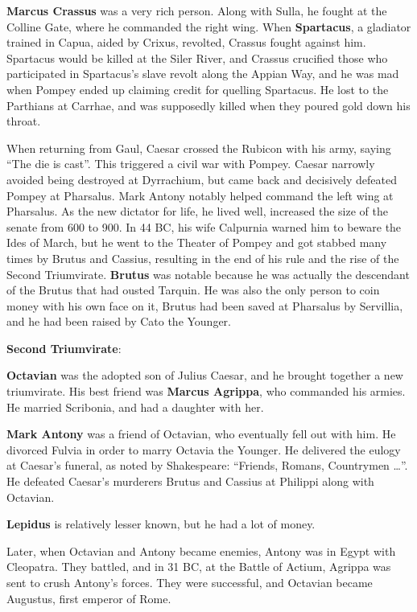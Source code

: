 \textbf{Marcus Crassus} was a very rich person.
Along with Sulla, he fought at the Colline Gate, where he commanded the right wing.
When \textbf{Spartacus}, a gladiator trained in Capua, aided by Crixus, revolted, Crassus fought against him.
Spartacus would be killed at the Siler River, and
Crassus crucified those who participated in Spartacus's slave revolt along the Appian Way,
and he was mad when Pompey ended up claiming credit for quelling Spartacus.
He lost to the Parthians at Carrhae, and was supposedly killed when they poured gold down his throat.

When returning from Gaul, Caesar crossed the Rubicon with his army, saying ``The die is cast''.
This triggered a civil war with Pompey.
Caesar narrowly avoided being destroyed at Dyrrachium, but came back and decisively defeated Pompey at Pharsalus.
Mark Antony notably helped command the left wing at Pharsalus.
As the new dictator for life, he lived well, increased the size of the senate from 600 to 900.
In 44 BC, his wife Calpurnia warned him to beware the Ides of March,
but he went to the Theater of Pompey and got stabbed many times by Brutus and Cassius,
resulting in the end of his rule and the rise of the Second Triumvirate.
\textbf{Brutus} was notable because he was actually the descendant of the Brutus that had ousted Tarquin.
He was also the only person to coin money with his own face on it,
Brutus had been saved at Pharsalus by Servillia, and he had been raised by Cato the Younger.

\textbf{Second Triumvirate}:

\textbf{Octavian} was the adopted son of Julius Caesar, and he brought together a new triumvirate.
His best friend was \textbf{Marcus Agrippa}, who commanded his armies.
He married Scribonia, and had a daughter with her.

\textbf{Mark Antony} was a friend of Octavian, who eventually fell out with him.
He divorced Fulvia in order to marry Octavia the Younger.
He delivered the eulogy at Caesar's funeral, as noted by Shakespeare:
``Friends, Romans, Countrymen \ldots''.
He defeated Caesar's murderers Brutus and Cassius at Philippi along with Octavian.

\textbf{Lepidus} is relatively lesser known, but he had a lot of money.

Later, when Octavian and Antony became enemies, Antony was in Egypt with Cleopatra.
They battled, and in 31 BC, at the Battle of Actium, Agrippa was sent to crush Antony's forces.
They were successful, and Octavian became Augustus, first emperor of Rome.

